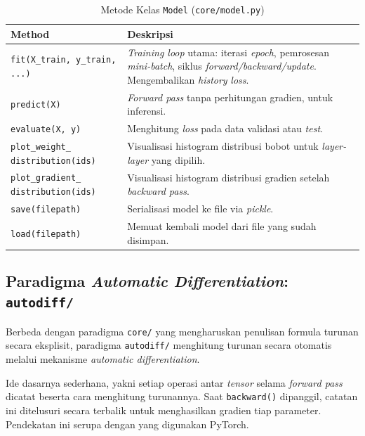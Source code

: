 \begin{table}[H]
    \centering
    \caption{Metode Kelas \texttt{Model} (\texttt{core/model.py})}
    \begin{tabular}{p{4.5cm}p{9cm}}
        \toprule
        \textbf{Method} & \textbf{Deskripsi} \\
        \midrule
        \texttt{fit(X\_train, y\_train, ...)} & \textit{Training loop} utama: iterasi \textit{epoch}, pemrosesan \textit{mini-batch}, siklus \textit{forward/backward/update}. Mengembalikan \textit{history} \textit{loss}. \\[4pt]
        \texttt{predict(X)} & \textit{Forward pass} tanpa perhitungan gradien, untuk inferensi. \\[4pt]
        \texttt{evaluate(X, y)} & Menghitung \textit{loss} pada data validasi atau \textit{test}. \\[4pt]
        \texttt{plot\_weight\_ distribution(ids)} & Visualisasi histogram distribusi bobot untuk \textit{layer-layer} yang dipilih. \\[4pt]
        \texttt{plot\_gradient\_ distribution(ids)} & Visualisasi histogram distribusi gradien setelah \textit{backward pass}. \\[4pt]
        \texttt{save(filepath)} & Serialisasi model ke file via \textit{pickle}. \\[4pt]
        \texttt{load(filepath)} & Memuat kembali model dari file yang sudah disimpan. \\
        \bottomrule
    \end{tabular}
    \label{tab:model-method}
\end{table}

\subsection{Paradigma \textit{Automatic Differentiation}: \texttt{autodiff/}}

Berbeda dengan paradigma \texttt{core/} yang mengharuskan penulisan formula turunan secara eksplisit, paradigma \texttt{autodiff/} menghitung turunan secara otomatis melalui mekanisme \textit{automatic differentiation}.

Ide dasarnya sederhana, yakni setiap operasi antar \textit{tensor} selama \textit{forward pass} dicatat beserta cara menghitung turunannya. Saat \texttt{backward()} dipanggil, catatan ini ditelusuri secara terbalik untuk menghasilkan gradien tiap parameter. Pendekatan ini serupa dengan yang digunakan PyTorch.

